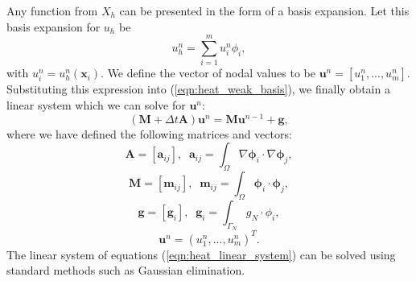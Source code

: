 Any function from $X_{h}$ can be presented in the form of a basis expansion. Let this basis expansion for $u_{h}$ be
\begin{equation*}
u_{h}^{n}=\sum^{m}_{i=1} u_{i}^{n}\phi_{i},
\end{equation*}
with $u_{i}^{n}=u_{h}^{n}(\mathbf{x}_{i})$. We define the vector of nodal values to be $\mathbf{u}^{n} = \left[u_{1}^{n},...,u_{m}^{n} \right]$. Substituting this expression into (\ref{eqn:heat_weak_basis}), we finally obtain a linear system which we can solve for $\mathbf{u}^{n}$:
\begin{equation}
(\mathbf{M}+\Delta t \mathbf{A})\mathbf{u}^{n}=\mathbf{M}\mathbf{u}^{n-1} + \mathbf{g},
\label{eqn:heat_linear_system}
\end{equation}
 where we have defined the following matrices and vectors:
 \begin{equation*}
  \mathbf{A}=[\mathbf{a}_{ij}], \;\; \mathbf{a}_{ij}=\int_{\Omega} \nabla \mathbf{\phi}_{i} \cdot \nabla\mathbf{\phi}_{j},
 \end{equation*}
 \begin{equation*}
  \mathbf{M}=[\mathbf{m}_{ij}], \;\; \mathbf{m}_{ij}=\int_{\Omega}  \mathbf{\phi}_{i} \cdot \mathbf{\phi}_{j}, 
 \end{equation*}
  \begin{equation*}
  \mathbf{g}=[\mathbf{g}_{i}], \;\; \mathbf{g}_{i}=\int_{\Gamma_{N}}{{g}_{N}} \cdot {\phi}_{i}, 
 \end{equation*}
\begin{equation*}
  \mathbf{u}^{n}=(u_{1}^{n},...,u_{m}^{n})^{T}. 
 \end{equation*}
%
The linear system of equations (\ref{eqn:heat_linear_system}) can be solved using standard methods such as Gaussian elimination.







